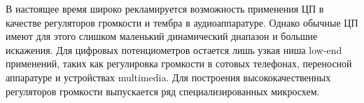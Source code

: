 В настоящее время широко рекламируется возможность применения ЦП в качестве регуляторов громкости и тембра в аудиоаппаратуре. Однако обычные ЦП имеют для этого слишком маленький динамический диапазон и большие искажения. Для цифровых потенциометров остается лишь узкая ниша low-end применений, таких как регулировка громкости в сотовых телефонах, переносной аппаратуре и устройствах multimedia. Для построения высококачественных регуляторов громкости выпускается ряд специализированных микросхем. 
